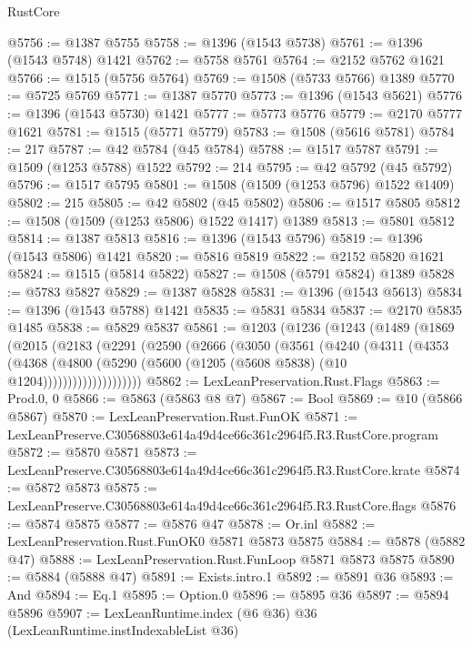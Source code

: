 \begin{lexlean}{RustCore}
\begin{coremodule}
@5756 := @1387 @5755
@5758 := @1396 (@1543 @5738)
@5761 := @1396 (@1543 @5748) @1421
@5762 := @5758 @5761
@5764 := @2152 @5762 @1621
@5766 := @1515 (@5756 @5764)
@5769 := @1508 (@5733 @5766) @1389
@5770 := @5725 @5769
@5771 := @1387 @5770
@5773 := @1396 (@1543 @5621)
@5776 := @1396 (@1543 @5730) @1421
@5777 := @5773 @5776
@5779 := @2170 @5777 @1621
@5781 := @1515 (@5771 @5779)
@5783 := @1508 (@5616 @5781)
@5784 := 217
@5787 := @42 @5784 (@45 @5784)
@5788 := @1517 @5787
@5791 := @1509 (@1253 @5788) @1522
@5792 := 214
@5795 := @42 @5792 (@45 @5792)
@5796 := @1517 @5795
@5801 := @1508 (@1509 (@1253 @5796) @1522 @1409)
@5802 := 215
@5805 := @42 @5802 (@45 @5802)
@5806 := @1517 @5805
@5812 := @1508 (@1509 (@1253 @5806) @1522 @1417) @1389
@5813 := @5801 @5812
@5814 := @1387 @5813
@5816 := @1396 (@1543 @5796)
@5819 := @1396 (@1543 @5806) @1421
@5820 := @5816 @5819
@5822 := @2152 @5820 @1621
@5824 := @1515 (@5814 @5822)
@5827 := @1508 (@5791 @5824) @1389
@5828 := @5783 @5827
@5829 := @1387 @5828
@5831 := @1396 (@1543 @5613)
@5834 := @1396 (@1543 @5788) @1421
@5835 := @5831 @5834
@5837 := @2170 @5835 @1485
@5838 := @5829 @5837
@5861 := @1203
    (@1236
      (@1243
        (@1489
          (@1869
            (@2015
              (@2183
                (@2291
                  (@2590
                    (@2666
                      (@3050
                        (@3561
                          (@4240
                            (@4311
                              (@4353
                                (@4368
                                  (@4800
                                    (@5290
                                      (@5600 (@1205 (@5608 @5838) (@10 @1204))))))))))))))))))))
@5862 := LexLeanPreservation.Rust.Flags
@5863 := Prod.{0, 0}
@5866 := @5863 (@5863 @8 @7)
@5867 := Bool
@5869 := @10 (@5866 @5867)
@5870 := LexLeanPreservation.Rust.FunOK
@5871 := LexLeanPreserve.C30568803e614a49d4ce66c361c2964f5.R3.RustCore.program
@5872 := @5870 @5871
@5873 := LexLeanPreserve.C30568803e614a49d4ce66c361c2964f5.R3.RustCore.krate
@5874 := @5872 @5873
@5875 := LexLeanPreserve.C30568803e614a49d4ce66c361c2964f5.R3.RustCore.flags
@5876 := @5874 @5875
@5877 := @5876 @47
@5878 := Or.inl
@5882 := LexLeanPreservation.Rust.FunOK0 @5871 @5873 @5875
@5884 := @5878 (@5882 @47)
@5888 := LexLeanPreservation.Rust.FunLoop @5871 @5873 @5875
@5890 := @5884 (@5888 @47)
@5891 := Exists.intro.{1}
@5892 := @5891 @36
@5893 := And
@5894 := Eq.{1}
@5895 := Option.{0}
@5896 := @5895 @36
@5897 := @5894 @5896
@5907 := LexLeanRuntime.index
    (@6 @36)
    @36
    (LexLeanRuntime.instIndexableList @36)

\end{coremodule}
\end{lexlean}
